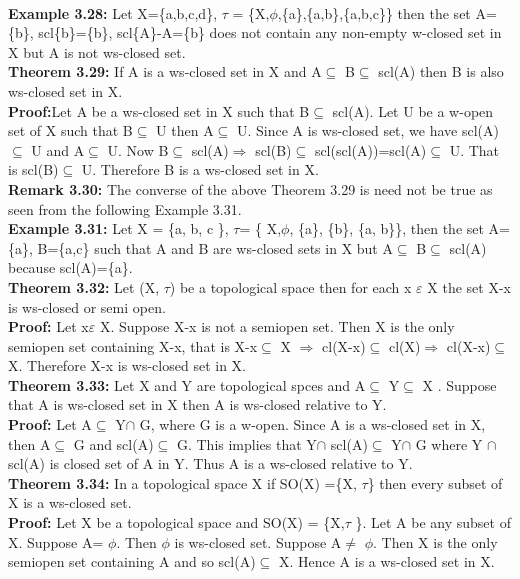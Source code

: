 {{{				\\\textbf{Example 3.28:} Let X=\{a,b,c,d\}, $\tau$ = \{X,$\phi$,\{a\},\{a,b\},\{a,b,c\}\} then the set A=\{b\}, scl\{b\}=\{b\}, scl\{A\}-A=\{b\} does not contain any non-empty w-closed set in X but A is not ws-closed set.
				\\\textbf{Theorem 3.29:} If A is a  ws-closed set in X and A$\subseteq$ B$\subseteq$ scl(A) then B is also ws-closed set in X.
				\\\textbf{Proof:}Let A be a  ws-closed set in X such that B$\subseteq$ scl(A). Let U be a w-open set of X such that B$\subseteq$ U then A$\subseteq$ U. Since A is ws-closed set, we have scl(A)$\subseteq$ U and A$\subseteq$ U. Now B$\subseteq$ scl(A)$\Longrightarrow$   scl(B)$\subseteq$ scl(scl(A))=scl(A)$\subseteq$ U. That is scl(B)$\subseteq$ U. Therefore B is a  ws-closed set in X.
				\\\textbf{Remark 3.30:} The converse of the above Theorem 3.29 is need not be true as seen from the following Example 3.31.
				\\\textbf{Example 3.31:} Let X = \{a, b, c \},   $\tau$= \{ X,$\phi$, \{a\}, \{b\}, \{a, b\}\}, then the set A=\{a\}, B=\{a,c\} such that A and B are  ws-closed sets in X but A$\subseteq$ B$\subseteq$ scl(A)  because scl(A)=\{a\}.
				\\\textbf{Theorem 3.32:} Let (X, $\tau$) be a topological space then for each x $\varepsilon$ X the set X-{x} is ws-closed or semi open.
				\\\textbf{Proof:} Let x$\varepsilon$ X. Suppose X-{x} is not a semiopen set. Then X is the only  semiopen set containing X-{x}, that is X-{x}$\subseteq$  X $\Longrightarrow$  cl(X-{x})$\subseteq$  cl(X)$\Longrightarrow$   cl(X-{x})$\subseteq$ X. Therefore X-{x} is ws-closed set in X.
				\\\textbf{Theorem 3.33:} Let X and Y are topological spces and  A$\subseteq$ Y$\subseteq$ X . Suppose that A is ws-closed set in X then A is  ws-closed relative to Y.
				\\\textbf{Proof:} Let A$\subseteq$ Y$\cap$ G, where G is a w-open. Since A is a  ws-closed set in X, then A$\subseteq$ G and scl(A)$\subseteq$ G. This implies that Y$\cap$ scl(A)$\subseteq$  Y$\cap$ G where  Y $\cap$ scl(A) is closed set of A in Y. Thus A is a ws-closed relative to Y.
				\\\textbf{Theorem 3.34:} In a topological space X if SO(X) =\{X, $\tau$\} then every subset of X is a ws-closed set.
				\\\textbf{Proof:} Let X be a topological space and SO(X) = \{X,$\tau$ \}. Let A be any subset of X. Suppose A= $\phi$. Then  $\phi$   is ws-closed set. Suppose A$\neq$ $\phi$.  Then X is the only semiopen set containing A and so scl(A)$\subseteq$ X. Hence A is a ws-closed set in X.
}}}
